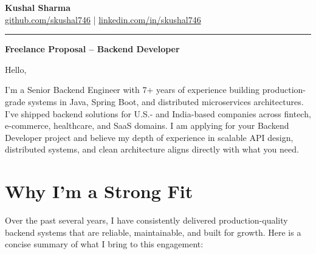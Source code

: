 \documentclass[11pt,letterpaper]{article}
\begin{document}
\begin{center}
    {\LARGE \textbf{Kushal Sharma}} \\
    \vspace{3pt}
    \small
    \href{https://github.com/skushal746}{github.com/skushal746} \quad|\quad
    \href{https://www.linkedin.com/in/skushal746}{linkedin.com/in/skushal746}
\end{center}

\vspace{0.5em}
\noindent\rule{\linewidth}{0.6pt}
\vspace{0.2em}

{\Large \textbf{Freelance Proposal -- Backend Developer}}

\vspace{0.3em}

Hello,

I'm a Senior Backend Engineer with 7+ years of experience building production-grade systems in Java, Spring Boot, and distributed microservices architectures. I've shipped backend solutions for U.S.- and India-based companies across fintech, e-commerce, healthcare, and SaaS domains. I am applying for your Backend Developer project and believe my depth of experience in scalable API design, distributed systems, and clean architecture aligns directly with what you need.

\section{Why I'm a Strong Fit}

Over the past several years, I have consistently delivered production-quality backend systems that are reliable, maintainable, and built for growth. Here is a concise summary of what I bring to this engagement:
\end{document}

